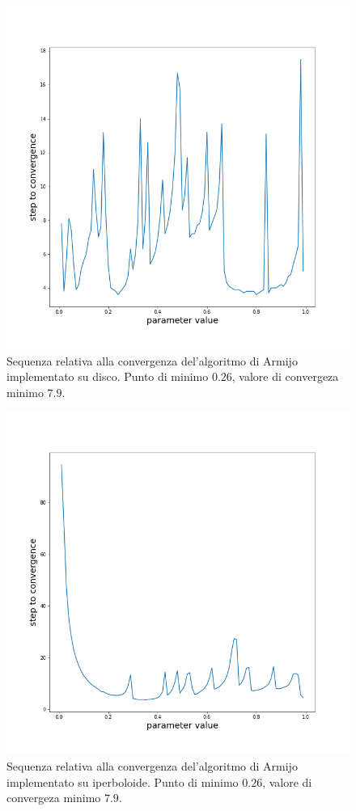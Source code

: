\documentclass[a4paper, 12pt]{article}
\begin{document}
\begin{figure}[H] %
    \centering\includegraphics[width=1\textwidth]{armijo_parameter_poincare.png}
    \caption{Sequenza relativa alla convergenza del'algoritmo di Armijo implementato su disco. Punto di minimo $0.26$, valore di convergeza minimo $7.9$.}
\end{figure}
\begin{figure}[H] %
    \centering\includegraphics[width=1\textwidth]{armijo_parameter_hyperboloid.png}
    \caption{Sequenza relativa alla convergenza del'algoritmo di Armijo implementato su iperboloide. Punto di minimo $0.26$, valore di convergeza minimo $7.9$.}
\end{figure}
\end{document}
